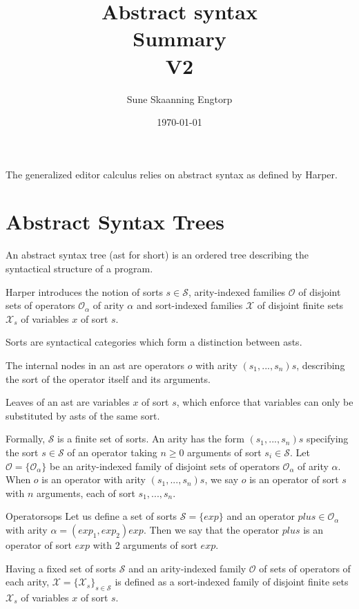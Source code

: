 \documentclass{article}
\title{Abstract syntax \\ Summary \\ V2}
\date{\today}
\author{Sune Skaanning Engtorp}
\begin{document}
\maketitle

The generalized editor calculus\cite{aalborg} relies on abstract syntax as defined by Harper\cite{harper}.

\section{Abstract Syntax Trees}
An abstract syntax tree (ast for short) is an ordered tree describing the syntactical structure of a program.

Harper introduces the notion of sorts $s \in \mathcal{S}$, arity-indexed families $\mathcal{O}$ of disjoint sets of operators $\mathcal{O}_\alpha$ of arity $\alpha$ and sort-indexed families $\mathcal{X}$ of disjoint finite sets $\mathcal{X}_s$ of variables $x$ of sort $s$.

Sorts are syntactical categories which form a distinction between asts.

The internal nodes in an ast are operators $o$ with arity $(s_1,...,s_n)s$, describing the sort of the operator itself and its arguments.

Leaves of an ast are variables $x$ of sort $s$, which enforce that variables can only be substituted by asts of the same sort.

Formally,  $\mathcal{S}$ is a finite set of sorts. An arity has the form $(s_1,...,s_n)s$ specifying the sort $s \in \mathcal{S}$ of an operator taking $n \geq 0$ arguments of sort $s_i \in \mathcal{S}$. Let $\mathcal{O} = \{ \mathcal{O}_\alpha \}$ be an arity-indexed family of disjoint sets of operators $\mathcal{O}_\alpha$ of arity $\alpha$. When $o$ is an operator with arity $(s_1,...,s_n)s$, we say $o$ is an operator of sort $s$ with $n$ arguments, each of sort $s_1,...,s_n$. 

\begin{example}{Operators}{ops}
Let us define a set of sorts $\mathcal{S} = \{ exp \}$ and an operator $plus \in \mathcal{O}_\alpha$ with arity $\alpha = (exp_1,exp_2)exp$. Then we say that the operator $plus$ is an operator of sort $exp$ with 2 arguments of sort $exp$.
\end{example}

Having a fixed set of sorts $\mathcal{S}$ and an arity-indexed family $\mathcal{O}$ of sets of operators of each arity, $\mathcal{X} = \{ \mathcal{X}_s \}_{s \in \mathcal{S}}$ is defined as a sort-indexed family of disjoint finite sets $\mathcal{X}_s$ of variables $x$ of sort $s$.
\end{document}
